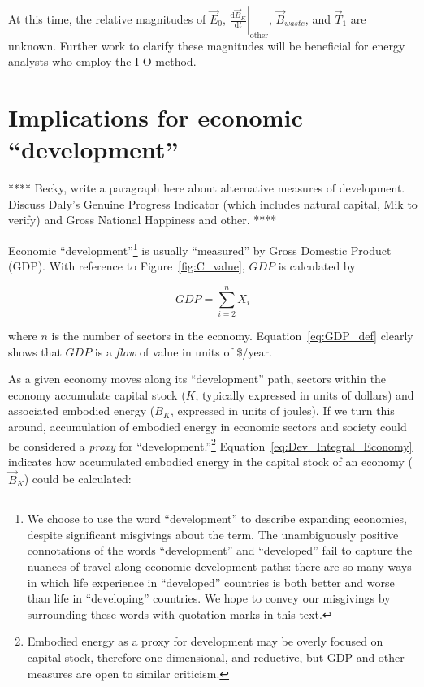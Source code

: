 At this time, the relative magnitudes of $\vec{E}_{0}$,
$\left. \frac{\mathrm{d}\vec{B}_{K}}{\mathrm{d}t} \right|_{\mathrm{other}}$,
$\vec{B}_{waste}$, and $\vec{T}_{1}$ are unknown. 
Further work to clarify these magnitudes will be beneficial
for energy analysts who employ the I-O method.
 

\section{Implications for economic ``development''}
\label{sec:implications_for_development}

**** Becky, write a paragraph here about alternative measures of development. 
Discuss Daly's Genuine Progress Indicator (which includes natural capital, Mik to verify)
and Gross National Happiness and other. ****

Economic ``development''\footnote{We choose to use the word ``development'' to
describe expanding economies, despite significant misgivings about the term. 
The unambiguously positive connotations of the words ``development'' and ``developed''
fail to capture the nuances of travel along economic development paths:
there are so many ways in which life experience in ``developed'' countries 
is both better and worse than life in ``developing'' countries.
We hope to convey our misgivings by surrounding these words with quotation marks in this text.}
is usually ``measured''
by Gross Domestic Product (GDP).
With reference to Figure~\ref{fig:C_value}, $GDP$ is calculated by

\begin{equation} \label{eq:GDP_def}
	GDP
	= \sum\limits_{i=2}^{n} \dot{X}_{i}
\end{equation}

\noindent{}where $n$ is the number of sectors in the economy.
Equation~\ref{eq:GDP_def} clearly shows that 
$GDP$ is a \emph{flow} of value in units of \$/year.

As a given economy moves along its ``development'' path,
sectors within the economy accumulate capital stock 
($K$, typically expressed in units of dollars)
and associated embodied energy 
($B_{K}$, expressed in units of joules).
If we turn this around, 
accumulation of embodied energy in economic sectors and society 
could be considered a \emph{proxy} for ``development.''\footnote{Embodied energy 
as a proxy for development may be overly focused on capital stock, 
therefore one-dimensional, and reductive, 
but GDP and other measures are open to similar criticism.}
Equation~\ref{eq:Dev_Integral_Economy} indicates how accumulated
embodied energy in the capital stock 
of an economy ($\vec{B}_{K}$) could be calculated:

